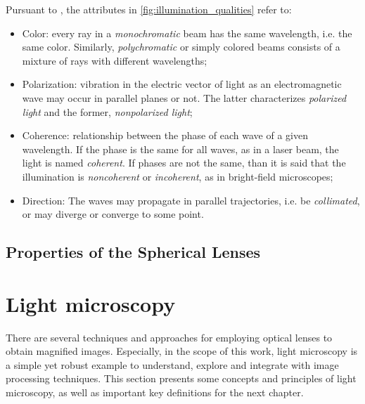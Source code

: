 Pursuant to , the attributes in \autoref{fig:illumination_qualities} 
refer to:

\begin{itemize}
    \item Color: every ray in a \emph{monochromatic} beam has the same wavelength, i.e. the same color. Similarly, \emph{polychromatic} or simply colored beams consists of a mixture of rays with different wavelengths;
    
    \item Polarization: vibration in the electric vector of light as an electromagnetic wave may occur
    in parallel planes or not. The latter characterizes \emph{polarized light} and the former, \emph{nonpolarized light};
    
    \item Coherence: relationship between the phase of each wave of a given wavelength. If the phase is the same for all waves, as in a laser beam, the light is named \emph{coherent}. If phases are not the same, than it is said that the illumination is \emph{noncoherent} or \emph{incoherent}, as in bright-field microscopes;
    
    \item Direction: The waves may propagate in parallel trajectories, i.e. be \emph{collimated}, or may diverge or converge to some point.
    
\end{itemize}

\subsection{Properties of the Spherical Lenses}

    

\section{Light microscopy}
\label{sec:light_microscopy}

There are several techniques and approaches for employing optical lenses to obtain magnified images. Especially, in the scope of this work, light microscopy is a simple yet robust example to understand, explore and integrate with image processing techniques. This section presents some concepts and principles of light microscopy, as well as important key definitions for the next chapter.

